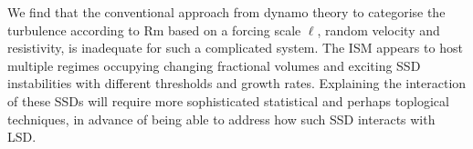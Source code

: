 \documentclass[preprint2]{aastex63}
\newcommand\pc{~ {\rm pc}}
\newcommand\dx{ {\delta x}}
\begin{document}
We find that the conventional approach from dynamo theory to categorise the 
turbulence according to Rm based on a forcing scale $\ell$, random velocity and
resistivity, is inadequate for such a complicated system.
The ISM appears to host multiple regimes occupying changing fractional volumes
and exciting SSD instabilities with different thresholds and growth rates.
Explaining the interaction of these SSDs will require more sophisticated
statistical and perhaps toplogical techniques, in advance of being able to 
address how such SSD interacts with LSD.
\end{document}
